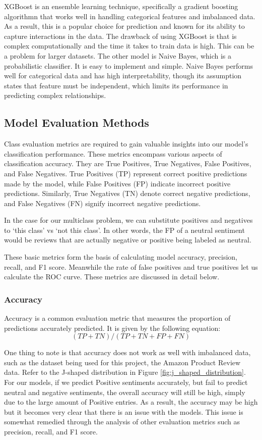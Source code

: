 \documentclass[stu,12pt,floatsintext]{apa7}
\begin{document}
XGBoost is an ensemble learning technique, specifically a gradient boosting algorithmn that works well in handling categorical features and imbalanced data. As a result, this is a popular choice for prediction and known for its ability to capture interactions in the data. The drawback of using XGBoost is that is complex computationally and the time it takes to train data is high. This can be a problem for larger datasets. The other model is Naive Bayes, which is a probabilistic classifier. It is easy to implement and simple. Naive Bayes performs well for categorical data and has high interpretability, though its assumption states that feature must be independent, which limits its performance in predicting complex relationships.

\subsection{Model Evaluation Methods}

Class evaluation metrics are required to gain valuable insights into our model's classification performance. These metrics encompass various aspects of classification accuracy. They are True Positives, True Negatives, False Positives, and False Negatives. True Positives (TP) represent correct positive predictions made by the model, while False Positives (FP) indicate incorrect positive predictions. Similarly, True Negatives (TN) denote correct negative predictions, and False Negatives (FN) signify incorrect negative predictions.

In the case for our multiclass problem, we can substitute positives and negatives to `this class' vs `not this class'. In other words, the FP of a neutral sentiment would be reviews that are actually negative or positive being labeled as neutral.

These basic metrics form the basis of calculating model accuracy, precision, recall, and F1 score. Meanwhile the rate of false positives and true positives let us calculate the ROC curve. These metrics are discussed in detail below.

\subsubsection{Accuracy}
Accuracy is a common evaluation metric that measures the proportion of predictions accurately predicted. It is given by the following equation:
\[(TP + TN) / (TP + TN + FP + FN)\]

One thing to note is that accuracy does not work as well with imbalanced data, such as the dataset being used for this project, the Amazon Product Review data. Refer to the J-shaped distribution in Figure \ref{fig:j_shaped_distribution}. For our models, if we predict Positive sentiments accurately, but fail to predict neutral and negative sentiments, the overall accuracy will still be high, simply due to the large amount of Positive entries. As a result, the accuracy may be high but it becomes very clear that there is an issue with the models. This issue is somewhat remedied through the analysis of other evaluation metrics such as precision, recall, and F1 score.
\end{document}
